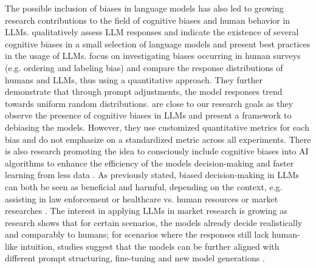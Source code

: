 \par The possible inclusion of biases in language models has also led to growing research contributions to the field of cognitive biases and human behavior in LLMs. \textcite{talboy2023challenging} qualitatively assess LLM responses and indicate the existence of several cognitive biases in a small selection of language models and present best practices in the usage of LLMs. \textcite{dominguez2023questioning} focus on investigating biases occurring in human surveys (e.g. ordering and labeling bias) and compare the response distributions of humans and LLMs, thus using a quantitative approach. They further demonstrate that through prompt adjustments, the model responses trend towards uniform random distributions. \textcite{echterhoff2024cognitive} are close to our research goals as they observe the presence of cognitive biases in LLMs and present a framework to debiasing the models. However, they use customized quantitative metrics for each bias and do not emphasize on a standardized metric across all experiments. There is also research promoting the idea to consciously include cognitive biases into AI algorithms to enhance the efficiency of the models decision-making and faster learning from less data \parencite{hagendorff2024we, taniguchi2018machine}. As previously stated, biased decision-making in LLMs can both be seen as beneficial and harmful, depending on the context, e.g. assisting in law enforcement or healthcare vs. human resources or market researches \parencite{zhao2023survey}. The interest in applying LLMs in market research is growing as research shows that for certain scenarios, the models already decide realistically and comparably to humans; for scenarios where the responses still lack human-like intuition, studies suggest that the models can be further aligned with different prompt structuring, fine-tuning and new model generations \parencite{brand2023using, qiu2023much}.